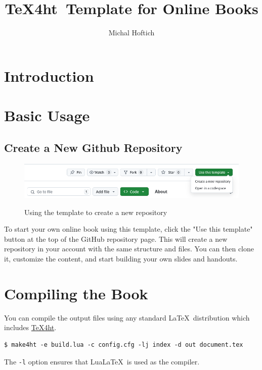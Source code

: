 \documentclass{book}
\begin{document}
\title{\TeX4ht\ Template for Online Books}
\author{Michal Hoftich}
\maketitle
\tableofcontents

\chapter{Introduction}



\chapter{Basic Usage}

\section{Create a New Github Repository}

\begin{figure}[htbp]
  \includegraphics[width=\textwidth,alt={Image of button for use of this repository as a template}]{img/template-use.png}
\caption{Using the template to create a new repository}
\end{figure}

To start your own online book using this template, click the "Use this
template" button at the top of the GitHub repository page. This will create a
new repository in your account with the same structure and files. You can then
clone it, customize the content, and start building your own slides and
handouts.


\chapter{Compiling the Book}


You can compile the output files using any standard \LaTeX\ distribution which includes \href{https://www.tug.org/tex4ht/}{\TeX4ht}.

\begin{verbatim}
$ make4ht -e build.lua -c config.cfg -lj index -d out document.tex
\end{verbatim}

The \verb|-l| option  ensures that Lua\LaTeX\ is used as the compiler. 
\end{document}
